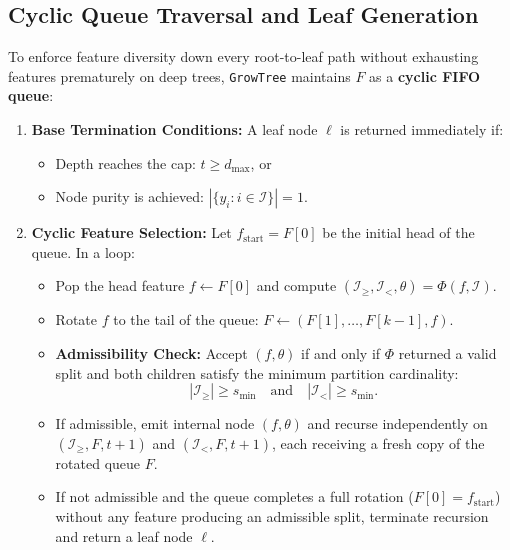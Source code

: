 \documentclass[11pt,a4paper]{article}
\newcommand{\code}[1]{\texttt{#1}}
\begin{document}
\subsection{Cyclic Queue Traversal and Leaf Generation}
\label{sec:queue}

To enforce feature diversity down every root-to-leaf path without exhausting features prematurely on deep trees, \code{GrowTree} maintains $F$ as a \textbf{cyclic FIFO queue}:
\begin{enumerate}[leftmargin=*, itemsep=4pt]
  \item \textbf{Base Termination Conditions:} A leaf node $\ell$ is returned immediately if:
  \begin{itemize}[itemsep=2pt]
    \item Depth reaches the cap: $t \ge d_{\max}$, or
    \item Node purity is achieved: $|\{y_i : i \in \mathcal{I}\}| = 1$.
  \end{itemize}

  \item \textbf{Cyclic Feature Selection:} Let $f_{\text{start}} = F[0]$ be the initial head of the queue. In a loop:
  \begin{itemize}[itemsep=2pt]
    \item Pop the head feature $f \gets F[0]$ and compute $(\mathcal{I}_{\ge}, \mathcal{I}_{<}, \theta) = \Phi(f, \mathcal{I})$.
    \item Rotate $f$ to the tail of the queue: $F \gets (F[1], \dots, F[k-1], f)$.
    \item \textbf{Admissibility Check:} Accept $(f, \theta)$ if and only if $\Phi$ returned a valid split and both children satisfy the minimum partition cardinality:
    \begin{equation}
      |\mathcal{I}_{\ge}| \ge s_{\min}
      \quad \text{and} \quad
      |\mathcal{I}_{<}| \ge s_{\min}.
    \end{equation}
    \item If admissible, emit internal node $(f, \theta)$ and recurse independently on $(\mathcal{I}_{\ge}, F, t+1)$ and $(\mathcal{I}_{<}, F, t+1)$, each receiving a fresh copy of the rotated queue $F$.
    \item If not admissible and the queue completes a full rotation ($F[0] = f_{\text{start}}$) without any feature producing an admissible split, terminate recursion and return a leaf node $\ell$.
  \end{itemize}


\end{enumerate}
\end{document}
